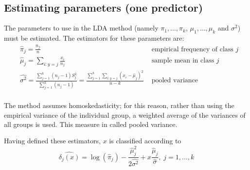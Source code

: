     \subsection{Estimating parameters (one predictor)}
      The parameters to use in the LDA method (namely $\pi_1, \dots, \pi_k$, $\mu_1, \dots, \mu_k$ and $\sigma^2$) must be estimated. The estimators for these parameters are:
      \begin{align*}
      &\hat{\pi}_j = \frac{n_j}{n}
      & \text{ empirical frequency of class }j\\
      &\hat{\mu}_j = \sum_{i:y=j} \frac{x_i}{n_j}
      & \text{ sample mean in class }j\\
      &\hat{\sigma^2} = \frac{\sum_{j=1}^{k}(n_j-1)S_j^2}{\sum_{j=1}^{k}(n_j-1)} = \frac{\sum_{j=1}^{k}\sum_{i:y=j}(x_i-\hat{\mu}_j)^2}{n-k}
      & \text{ pooled variance}\\
      \end{align*}

      The method assumes homoskedasticity; for this reason, rather than using the empirical variance of the individual group, a weighted average of the variances of all groups is used. This measure in called pooled variance. 

      Having defined these estimators, $x$ is classified according to  
      $$\hat{\delta_j(x)} = \log(\hat{\pi}_j) -\frac{\hat{\mu}_j^2}{2\hat{\sigma^2}} + x\frac{\hat{\mu}_j}{\hat{\sigma}}, \; j = 1, \dots, k$$ 
    
